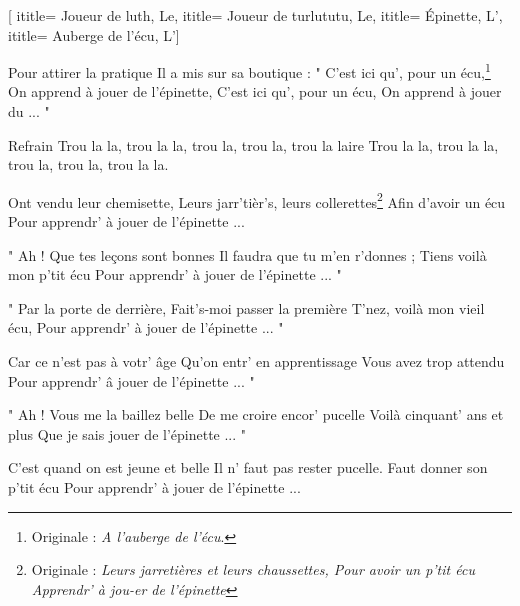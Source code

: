  [
ititle= {Joueur de luth, Le},
ititle= {Joueur de turlututu, Le},
ititle= {Épinette, L'},
ititle= {Auberge de l'écu, L'}]


\beginverse
{}
Pour attirer la pratique
Il a mis sur sa boutique :
" C'est ici qu', pour un écu,\footnote {Originale : \emph{A l'auberge de l'écu}.}
On apprend à jouer de l'épinette,
C'est ici qu', pour un écu,
On apprend à jouer du ... "
\endverse

\beginchorus
Refrain
Trou la la, trou la la, trou la, trou la, trou la laire
Trou la la, trou la la, trou la, trou la, trou la la.
\endchorus

\beginverse
{}
Ont vendu leur chemisette,
Leurs jarr'tièr's, leurs collerettes\footnote { Originale : \emph{Leurs jarretières et leurs chaussettes, Pour avoir un p'tit écu Apprendr' à jou-er de l'épinette}}
Afin d'avoir un écu
Pour apprendr' à jouer de l'épinette ...
\endverse

\beginverse
{}
" Ah ! Que tes leçons sont bonnes
Il faudra que tu m'en r'donnes ;
Tiens voilà mon p'tit écu
Pour apprendr' à jouer de l'épinette ... "
\endverse

\beginverse
{}
" Par la porte de derrière,
Fait's-moi passer la première
T'nez, voilà mon vieil écu,
Pour apprendr' à jouer de l'épinette ... "
\endverse

\beginverse
{}
Car ce n'est pas à votr' âge
Qu'on entr' en apprentissage
Vous avez trop attendu
Pour apprendr' â jouer de l'épinette ... "
\endverse

\beginverse
{}
" Ah ! Vous me la baillez belle
De me croire encor' pucelle
Voilà cinquant' ans et plus
Que je sais jouer de l'épinette ... "
\endverse

\beginverse
{}
C'est quand on est jeune et belle
Il n' faut pas rester pucelle.
Faut donner son p'tit écu
Pour apprendr' à jouer de l'épinette ...
\endverse

\endsong
